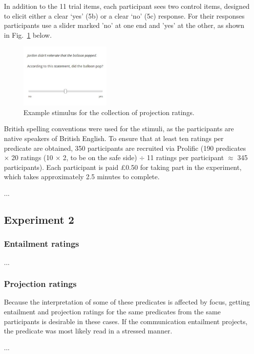 \documentclass[11pt,fleqn]{article}
\newcommand{\figref}[1]{Fig.~\ref{#1}}
\newcommand{\6}{\mbox{$[\hspace*{-.6mm}[$}}
\newcommand{\9}{\mbox{$]\hspace*{-.6mm}]$}}
\begin{document}
In addition to the 11 trial items, each participant sees two control items, designed to elicit either a clear `yes' (5b) or a clear `no' (5c) response. For their responses participants use a slider marked 'no' at one end and 'yes' at the other, as shown in \figref{exquest} below.

\begin{figure}[H]
	\centering
	\includegraphics[width=0.4\textwidth]{example-question}
	\caption{Example stimulus for the collection of projection ratings.}
	\label{exquest}
\end{figure}

British spelling conventions were used for the stimuli, as the participants are native speakers of British English. To ensure that at least ten ratings per predicate are obtained, 350 participants are recruited via Prolific (190 predicates \(\times\) 20 ratings (10 \(\times\) 2, to be on the safe side) \(\div\) 11 ratings per participant \(\approx\) 345 participants). Each participant is paid £0.50 for taking part in the experiment, which takes approximately 2.5 minutes to complete.

...

\subsection{Experiment 2}
\subsubsection{Entailment ratings}

...

\subsubsection{Projection ratings}

Because the interpretation of some of these predicates is affected by focus, getting entailment and projection ratings for the same predicates from the same participants is desirable in these cases. If the communication entailment projects, the predicate was most likely read in a stressed manner.

...


\pagebreak



\end{document}
